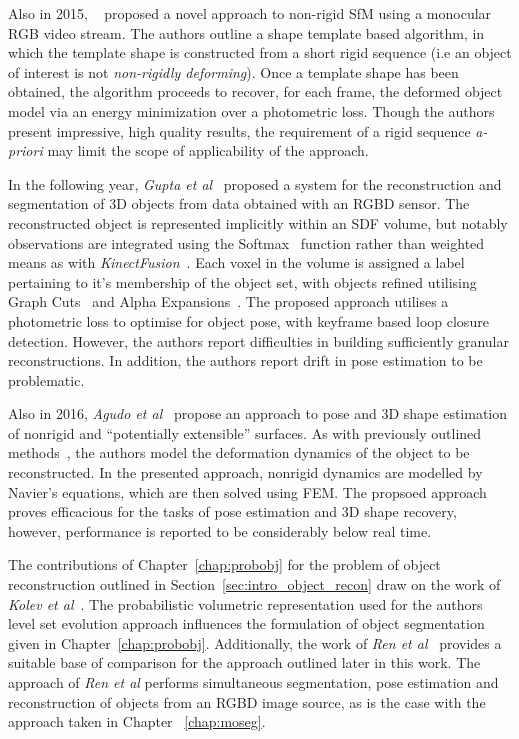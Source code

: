 Also in 2015, ~\cite{Yu2015} proposed a novel approach to non-rigid SfM using a monocular 
RGB video stream. The authors outline a shape template based algorithm, in which the template shape is 
constructed from a short rigid sequence (i.e an object of interest is not \textit{non-rigidly deforming}). 
Once a template shape has been obtained, the algorithm proceeds to recover, for each frame, the deformed 
object model via an energy minimization over a photometric loss. Though the authors present impressive, 
high quality results, the requirement of a rigid sequence \textit{a-priori} may limit the scope of 
applicability of the approach.

In the following year, \textit{Gupta et al}~\cite{Gupta2016} proposed a system for the reconstruction and 
segmentation of 3D objects from data obtained with an RGBD sensor. The reconstructed object is represented 
implicitly within an SDF volume, but notably observations are integrated using the Softmax~\cite{Murphy2012ML} 
function rather than weighted means as with \textit{KinectFusion}~\cite{Newcombe2011}. Each voxel in the 
volume is assigned a label pertaining to it's membership of the object set, with objects refined utilising 
Graph Cuts~\cite{CLRS} and Alpha Expansions~\cite{CLRS}. The proposed approach utilises a photometric loss to optimise 
for object pose, with keyframe based loop closure detection. However, the authors report difficulties in 
building sufficiently granular reconstructions. In addition, the authors report drift in pose estimation 
to be problematic.

Also in 2016, \textit{Agudo et al}~\cite{Agudo2016} propose an approach to pose and 3D shape estimation 
of nonrigid and ``potentially extensible'' surfaces. As with previously outlined methods~\cite{Tsap2000, Agudo2014}, 
the authors model the deformation dynamics of the object to be reconstructed. In the presented approach, 
nonrigid dynamics are modelled by Navier's equations, which are then solved using FEM. The propsoed approach 
proves efficacious for the tasks of pose estimation and 3D shape recovery, however, performance is reported 
to be considerably below real time.

The contributions of Chapter~\ref{chap:probobj} for the problem of object reconstruction outlined in 
Section~\ref{sec:intro_object_recon} draw on the work of \textit{Kolev et al}~\cite{Kolev2006}. The 
probabilistic volumetric representation used for the authors level set evolution approach influences the 
formulation of object segmentation given in Chapter~\ref{chap:probobj}. Additionally, the work of 
\textit{Ren et al}~\cite{Ren2013} provides a suitable base of comparison for the approach outlined later 
in this work. The approach of \textit{Ren et al} performs simultaneous segmentation, pose estimation and 
reconstruction of objects from an RGBD image source, as is the case with the approach taken in Chapter
~\ref{chap:moseg}.

